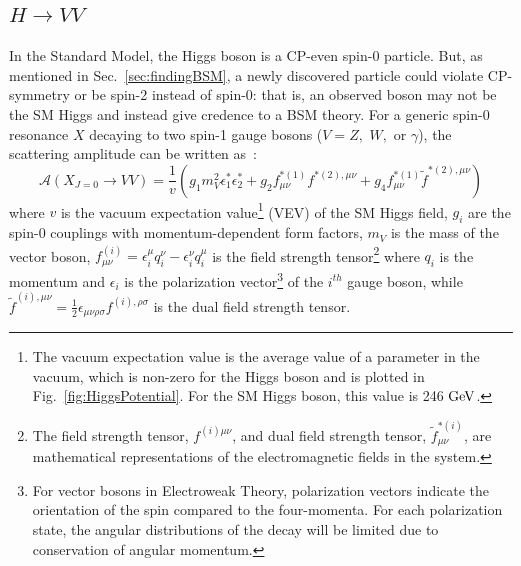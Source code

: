 \subsection{$H\rightarrow VV$}
\label{sec:HVVDecay}

In the Standard Model, the Higgs boson is a CP-even spin-0 particle. But, as mentioned in Sec.~\ref{sec:findingBSM}, a newly discovered particle could violate CP-symmetry or be spin-2 instead of spin-0: that is, an observed boson may not be the SM Higgs and instead give credence to a BSM theory. For a generic spin-0 resonance $X$ decaying to two spin-1 gauge bosons ($V=Z,$ $W,$ or $\gamma$), the scattering amplitude can be written as~\cite{Gao:2010qx}:
\begin{equation}
  \mathcal{A}(X_{J=0} \rightarrow VV) = \frac{1}{v}\left(g_1m_V^2\epsilon_1^*\epsilon_2^*+g_2f_{\mu\nu}^{*(1)}f^{*(2),\mu\nu}+g_4f_{\mu\nu}^{*(1)}\tilde{f}^{*(2),\mu\nu}\right)
\label{eq:scalarAmp_gform}
\end{equation}
where $v$ is the vacuum expectation value\footnote{The vacuum expectation value is the average value of a parameter in the vacuum, which is non-zero for the Higgs boson and is plotted in Fig.~\ref{fig:HiggsPotential}. For the SM Higgs boson, this value is 246 $\rm{GeV}$.} (VEV) of the SM Higgs field, $g_i$ are the spin-0 couplings with momentum-dependent form factors, $m_V$ is the mass of the vector boson, $f_{\mu\nu}^{(i)}=\epsilon_i^\mu q_i^\nu - \epsilon_i^\nu q_i^\mu$ is the field strength tensor\footnote{The field strength tensor, $f^{(i)\mu\nu}$, and dual field strength tensor, $\tilde{f}^{*(i)}_{\mu\nu}$, are mathematical representations of the electromagnetic fields in the system.} where $q_i$ is the momentum and $\epsilon_i$ is the polarization vector\footnote{For vector bosons in Electroweak Theory, polarization vectors indicate the orientation of the spin compared to the four-momenta. For each polarization state, the angular distributions of the decay will be limited due to conservation of angular momentum.} of the $i^{th}$ gauge boson, while $\tilde{f}^{(i),\mu\nu}=\frac{1}{2}\epsilon_{\mu\nu\rho\sigma}f^{(i),\rho\sigma}$ is the dual field strength tensor.

